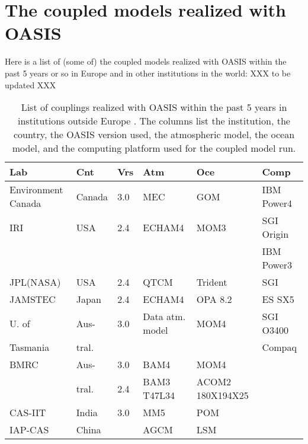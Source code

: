 \newpage

\chapter{The coupled models realized with OASIS}
\label{sec_couplings}

Here is a list of (some of) the coupled models realized with OASIS
within the past 5 years or so in Europe and in other institutions
in the world:
XXX to be updated XXX
\vspace*{3cm}

\begin{table}[hbtp]
\begin{center}
\begin{tabular}{|l|l|l|l|l|l|}
\hline
Lab & Cnt & Vrs & Atm & Oce & Comp \\
\hline
\hline
Environment Canada & Canada & 3.0  & MEC & GOM  & IBM Power4 \\ 
\hline     
IRI     & USA & 2.4 & ECHAM4             & MOM3            & SGI Origin \\
        &     &     &                    &                 & IBM Power3\\
\hline
JPL(NASA) & USA & 2.4 & QTCM             & Trident            & SGI \\
\hline
JAMSTEC	& Japan  & 2.4 & ECHAM4	         & OPA 8.2	   & ES SX5 \\
\hline
U. of & Aus- & 3.0 & Data atm. model & MOM4         & SGI O3400\\
Tasmania & tral.     &     &                    &                 & Compaq \\
\hline
BMRC	& Aus-    & 3.0 & BAM4         & MOM4            &        \\	
        & tral.          & 2.4 & BAM3 T47L34	 & ACOM2 180X194X25&        \\	
\hline
CAS-IIT & India	    & 3.0 & MM5          & POM             &        \\
\hline
IAP-CAS & China &   & AGCM               & LSM             &  \\
\hline	
\end{tabular}
\end{center}
\caption{List of couplings realized with OASIS within the past 5 years
in institutions outside Europe . The columns list the institution, the
country, the OASIS version used, the atmospheric model, the ocean
model, and the computing platform used for the coupled model run.}
\label{tab.couplingsworld}
\end{table}


